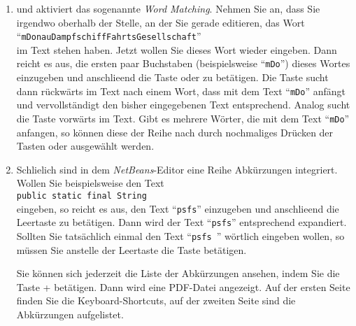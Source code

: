 \documentclass{article}
\begin{document}
\begin{enumerate}
      Sollte uns das Fenster mit den Methoden aus irgendeinem Grunde st\"oren, so k\"onnen wir
      es durch Bet\"atigen des -Taste schlie\3en.
\item {} und  aktiviert das sogenannte
      \emph{Word Matching}.  Nehmen Sie an, dass Sie irgendwo oberhalb der Stelle, an der
      Sie gerade editieren, das Wort \\[0.1cm]
      \hspace*{1.3cm} ``\texttt{mDonauDampfschiffFahrtsGesellschaft}'' \\[0.1cm]
      im Text stehen haben.  Jetzt wollen Sie dieses Wort wieder eingeben.
      Dann reicht es  aus, die ersten paar Buchstaben (beispielsweise ``\texttt{mDo}'')
      dieses Wortes einzugeben und anschlie\3end die Taste  oder
       zu bet\"atigen.   Die Taste  sucht dann r\"uckw\"arts im
      Text nach einem Wort, dass mit dem Text ``\texttt{mDo}'' anf\"angt und vervollst\"andigt
      den bisher eingegebenen Text entsprechend.  Analog sucht die Taste 
      vorw\"arts im Text.  Gibt es mehrere W\"orter, die mit dem Text ``\texttt{mDo}''
      anfangen, so k\"onnen diese der Reihe nach durch nochmaliges Dr\"ucken der Tasten 
       oder  ausgew\"ahlt werden.
\item Schlie\3lich sind in dem \textsl{NetBeans}-Editor eine Reihe Abk\"urzungen integriert.
      Wollen Sie beispielsweise den Text \\[0.1cm]
      \hspace*{1.3cm} \texttt{public static final String}\\[0.1cm]
      eingeben, so reicht es aus, den Text ``\texttt{psfs}'' einzugeben und anschlie\3end
      die Leertaste zu bet\"atigen.  Dann wird der Text ``\texttt{psfs}'' entsprechend
      expandiert.  Sollten Sie tats\"achlich einmal den Text ``\texttt{psfs }'' w\"ortlich
      eingeben wollen, so m\"ussen Sie anstelle der Leertaste die Taste
       bet\"atigen.

      Sie k\"onnen sich jederzeit die Liste der Abk\"urzungen ansehen, indem Sie 
      die Taste + bet\"atigen.
      Dann wird eine PDF-Datei angezeigt. Auf der ersten Seite finden Sie die
      Keyboard-Shortcuts, auf der zweiten Seite sind die Abk\"urzungen aufgelistet. 
\end{enumerate}
\end{document}
